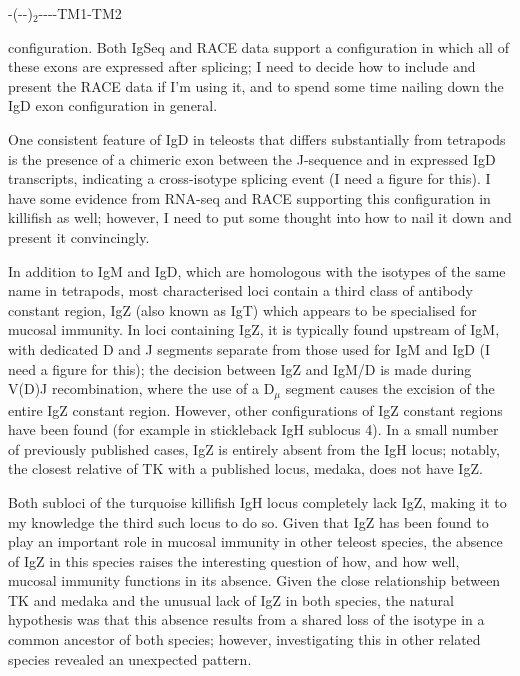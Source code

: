 -(--)$_2$----TM1-TM2 

configuration. Both IgSeq and RACE data support a configuration in which all of these exons are expressed after splicing; I need to decide how to include and present the RACE data if I'm using it, and to spend some time nailing down the IgD exon configuration in general.

One consistent feature of IgD in teleosts that differs substantially from tetrapods is the presence of a chimeric  exon between the J-sequence and  in expressed IgD transcripts, indicating a cross-isotype splicing event (I need a figure for this). I have some evidence from RNA-seq and RACE supporting this configuration in killifish as well; however, I need to put some thought into how to nail it down and present it convincingly.

In addition to IgM and IgD, which are homologous with the isotypes of the same name in tetrapods, most characterised loci contain a third class of antibody constant region, IgZ (also known as IgT) which appears to be specialised for mucosal immunity. In loci containing IgZ, it is typically found upstream of IgM, with dedicated D and J segments separate from those used for IgM and IgD (I need a figure for this); the decision between IgZ and IgM/D is made during V(D)J recombination, where the use of a D$_\mu$ segment causes the excision of the entire IgZ constant region. However, other configurations of IgZ constant regions have been found (for example in stickleback IgH sublocus 4). In a small number of previously published cases, IgZ is entirely absent from the IgH locus; notably, the closest relative of TK with a published locus, medaka, does not have IgZ.

Both subloci of the turquoise killifish IgH locus completely lack IgZ, making it to my knowledge the third such locus to do so. Given that IgZ has been found to play an important role in mucosal immunity in other teleost species, the absence of IgZ in this species raises the interesting question of how, and how well, mucosal immunity functions in its absence. Given the close relationship between TK and medaka and the unusual lack of IgZ in both species, the natural hypothesis was that this absence results from a shared loss of the isotype in a common ancestor of both species; however, investigating this in other related species revealed an unexpected pattern.



